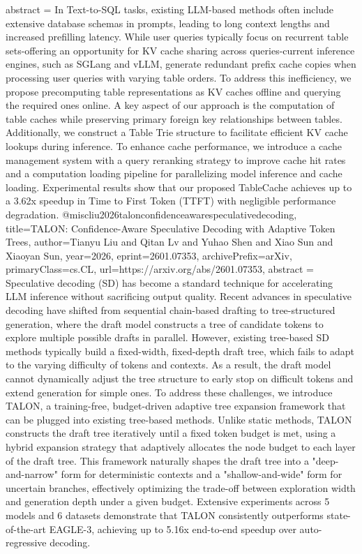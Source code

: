 {      abstract = {In Text-to-SQL tasks, existing LLM-based methods often include extensive database schemas in prompts, leading to long context lengths and increased prefilling latency. While user queries typically focus on recurrent table sets-offering an opportunity for KV cache sharing across queries-current inference engines, such as SGLang and vLLM, generate redundant prefix cache copies when processing user queries with varying table orders. To address this inefficiency, we propose precomputing table representations as KV caches offline and querying the required ones online. A key aspect of our approach is the computation of table caches while preserving primary foreign key relationships between tables. Additionally, we construct a Table Trie structure to facilitate efficient KV cache lookups during inference. To enhance cache performance, we introduce a cache management system with a query reranking strategy to improve cache hit rates and a computation loading pipeline for parallelizing model inference and cache loading. Experimental results show that our proposed TableCache achieves up to a 3.62x speedup in Time to First Token (TTFT) with negligible performance degradation.}
}@misc{liu2026talonconfidenceawarespeculativedecoding,
      title={TALON: Confidence-Aware Speculative Decoding with Adaptive Token Trees}, 
      author={Tianyu Liu and Qitan Lv and Yuhao Shen and Xiao Sun and Xiaoyan Sun},
      year={2026},
      eprint={2601.07353},
      archivePrefix={arXiv},
      primaryClass={cs.CL},
      url={https://arxiv.org/abs/2601.07353},
      abstract = {Speculative decoding (SD) has become a standard technique for accelerating LLM inference without sacrificing output quality. Recent advances in speculative decoding have shifted from sequential chain-based drafting to tree-structured generation, where the draft model constructs a tree of candidate tokens to explore multiple possible drafts in parallel. However, existing tree-based SD methods typically build a fixed-width, fixed-depth draft tree, which fails to adapt to the varying difficulty of tokens and contexts. As a result, the draft model cannot dynamically adjust the tree structure to early stop on difficult tokens and extend generation for simple ones. To address these challenges, we introduce TALON, a training-free, budget-driven adaptive tree expansion framework that can be plugged into existing tree-based methods. Unlike static methods, TALON constructs the draft tree iteratively until a fixed token budget is met, using a hybrid expansion strategy that adaptively allocates the node budget to each layer of the draft tree. This framework naturally shapes the draft tree into a "deep-and-narrow" form for deterministic contexts and a "shallow-and-wide" form for uncertain branches, effectively optimizing the trade-off between exploration width and generation depth under a given budget. Extensive experiments across 5 models and 6 datasets demonstrate that TALON consistently outperforms state-of-the-art EAGLE-3, achieving up to 5.16x end-to-end speedup over auto-regressive decoding.}
}
